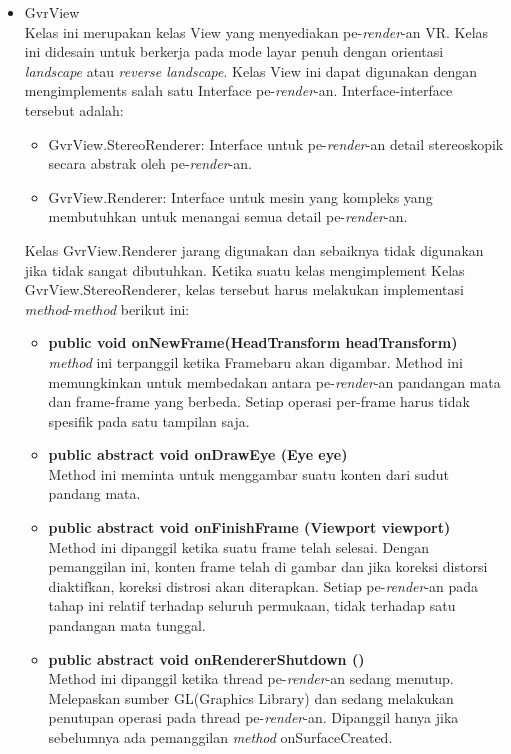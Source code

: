 \begin{itemize}
	\item GvrView\\
	Kelas ini merupakan kelas View yang menyediakan pe-\textit{render}-an VR. Kelas ini didesain untuk berkerja pada mode layar penuh dengan orientasi \textit{landscape} atau \textit{reverse landscape}. Kelas View ini dapat digunakan dengan mengimplements salah satu Interface pe-\textit{render}-an. Interface-interface tersebut adalah:
	\begin{itemize}
		\item GvrView.StereoRenderer: Interface untuk pe-\textit{render}-an detail stereoskopik secara abstrak oleh pe-\textit{render}-an.
		\item GvrView.Renderer: Interface untuk mesin yang kompleks yang membutuhkan untuk menangai semua detail pe-\textit{render}-an.
	\end{itemize}
Kelas GvrView.Renderer jarang digunakan dan sebaiknya tidak digunakan jika tidak sangat dibutuhkan.
Ketika suatu kelas mengimplement Kelas GvrView.StereoRenderer, kelas tersebut harus melakukan implementasi \textit{method}-\textit{method} berikut ini:
\begin{itemize}
	\item \textbf{public void onNewFrame(HeadTransform headTransform)}\\
	\textit{method} ini terpanggil ketika Framebaru akan digambar. Method ini memungkinkan untuk membedakan antara pe-\textit{render}-an pandangan mata dan frame-frame yang berbeda. Setiap operasi per-frame harus tidak spesifik pada satu tampilan saja.
	\item \textbf{public abstract void onDrawEye (Eye eye)}\\
	Method ini meminta untuk menggambar suatu konten dari sudut pandang mata.
	\item \textbf{public abstract void onFinishFrame (Viewport viewport)}\\
	Method ini dipanggil ketika suatu frame telah selesai. Dengan pemanggilan ini, konten frame telah di gambar dan jika koreksi distorsi diaktifkan, koreksi \textit{}distrosi akan diterapkan. Setiap pe-\textit{render}-an pada tahap ini relatif terhadap seluruh permukaan, tidak terhadap satu pandangan mata tunggal. 
	\item \textbf{public abstract void onRendererShutdown ()}\\
	Method ini dipanggil ketika thread pe-\textit{render}-an sedang menutup. Melepaskan sumber GL(Graphics Library) dan sedang melakukan penutupan operasi pada thread pe-\textit{render}-an. Dipanggil hanya jika sebelumnya ada pemanggilan \textit{method} onSurfaceCreated.

\end{itemize}
\end{itemize}
